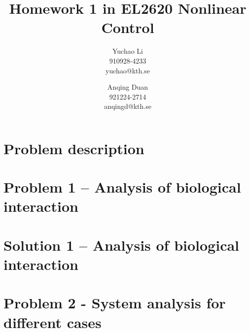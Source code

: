 \documentclass[a4paper,twocolumn]{article} %
\begin{document}

\title{Homework 1 in EL2620 Nonlinear Control}
\author{Yuchao Li \\ 910928-4233 \\ yuchao@kth.se \and Anqing Duan\\
  921224-2714 \\ anqingd@kth.se}

\maketitle                     %





\section*{Problem description}
\label{sec:prob}




\section*{Problem 1 -- Analysis of biological interaction}
\label{sec:pro1}



\section*{Solution 1 -- Analysis of biological interaction}
\label{sec:sol1}



\section*{Problem 2 - System analysis for different cases}
\label{sec:prob2}


\end{document}
